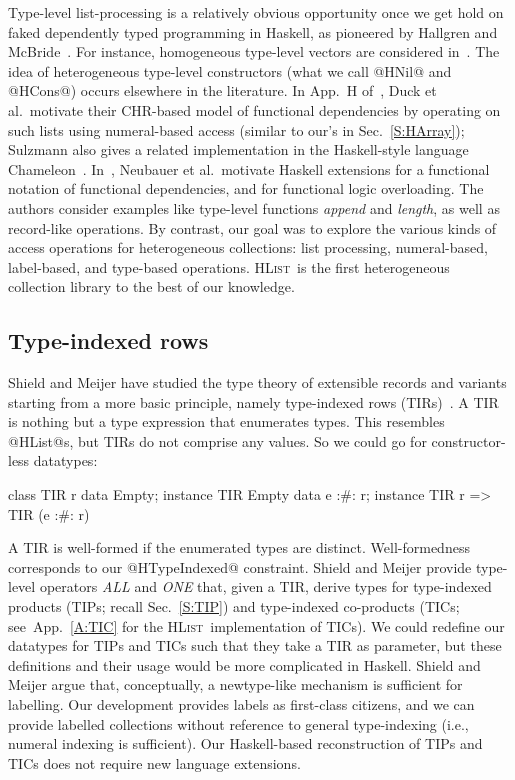 \documentclass[nocopyrightspace,preprint]{sigplan-proc}
\newcommand{\hwVsTr}[2]{#2}
\newcommand{\HList}{\textsc{HList}}
\begin{document}
Type-level list-processing is a relatively obvious opportunity once we
get hold on faked dependently typed programming in Haskell, as
pioneered by Hallgren and McBride~\cite{Hallgren01,Fake}. For
instance, homogeneous type-level vectors are considered
in~\cite{Fake}. The idea of heterogeneous type-level constructors
(what we call @HNil@ and @HCons@) occurs elsewhere in the
literature. In App.~H of~\cite{DPJSS04}, Duck et al.\ motivate their
CHR-based model of functional dependencies by operating on such lists
using numeral-based access (similar to our's in Sec.~\ref{S:HArray});
Sulzmann also gives a related implementation in the Haskell-style
language Chameleon~\cite{Chameleon}. In~\cite{NTGS01,NTGS02}, Neubauer
et al.\ motivate Haskell extensions for a functional notation of
functional dependencies, and for functional logic overloading. The
authors consider examples like type-level functions \emph{append} and
\emph{length}, as well as record-like operations. By contrast, our
goal was to explore the various kinds of access operations for
heterogeneous collections: list processing, numeral-based,
label-based, and type-based operations. \HList\ is the first
heterogeneous collection library to the best of our knowledge.






\medskip

\subsection*{Type-indexed rows}

Shield and Meijer have studied the type theory of extensible records
and variants starting from a more basic principle, namely type-indexed
rows (TIRs)~\cite{SM01}. A TIR is nothing but a type expression that
enumerates types. This resembles @HList@s, but TIRs do not comprise
any values. So we could go for constructor-less datatypes:

\begin{code}
 class TIR r
 data Empty; instance TIR Empty
 data e :#: r; instance TIR r => TIR (e :#: r)
\end{code}

A TIR is well-formed if the enumerated types are distinct.
Well-formedness corresponds to our @HTypeIndexed@ constraint. Shield
and Meijer provide type-level operators \emph{ALL} and \emph{ONE}
that, given a TIR, derive types for type-indexed products (TIPs;
recall Sec.~\ref{S:TIP}) and type-indexed co-products (TICs;
see~\hwVsTr{\cite{HList}}{App.~\ref{A:TIC}} for the \HList\
implementation of TICs). We could redefine our datatypes for TIPs and
TICs such that they take a TIR as parameter, but these definitions and
their usage would be more complicated in Haskell. Shield and Meijer
argue that, conceptually, a newtype-like mechanism is sufficient for
labelling. Our development provides labels as first-class citizens,
and we can provide labelled collections without reference to general
type-indexing (i.e., numeral indexing is sufficient). Our
Haskell-based reconstruction of TIPs and TICs does not require new
language extensions.
\end{document}
